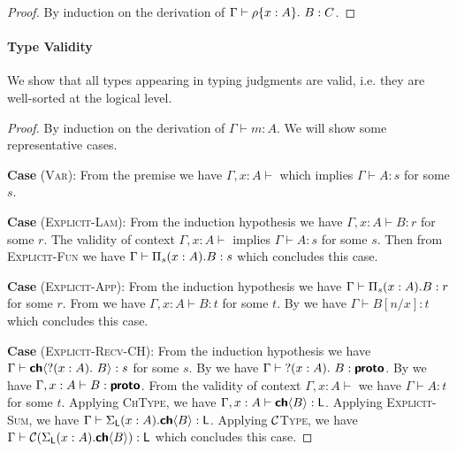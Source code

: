 \begin{proof}
  By induction on the derivation of $\Gamma \vdash {{\rho}\{{x : A}\}.\ {B}} : C$.
\end{proof}

\paragraph{\textbf{Type Validity}}
We show that all types appearing in typing judgments are valid, i.e. they are well-sorted
at the logical level.

\begin{proof}
  By induction on the derivation of $\Gamma \vdash m : A$. We will show some representative cases.

\textbf{Case} (\textsc{Var}): 
  From the premise we have $\Gamma, x : A \vdash$ which implies $\Gamma \vdash A : s$ for some $s$.

\textbf{Case} (\textsc{Explicit-Lam}):
  From the induction hypothesis we have $\Gamma, x : A \vdash B : r$ for some $r$.
  The validity of context $\Gamma, x : A \vdash$ implies $\Gamma \vdash A : s$ for some $s$.
  Then from \textsc{Explicit-Fun} we have $\Gamma \vdash \Pi_{s}({x : A}).{B} : s$ which concludes this case.

\textbf{Case} (\textsc{Explicit-App}):
  From the induction hypothesis we have $\Gamma \vdash \Pi_{s}({x : A}).{B} : r$ for some $r$.
  From  we have $\Gamma, x : A \vdash B : t$ for some $t$.
  By  we have $\Gamma \vdash B[n/x] : t$ which concludes this case.

\textbf{Case} (\textsc{Explicit-Recv-CH}):
  From the induction hypothesis we have $\Gamma \vdash {\textbf{\textsf{ch}}\langle{{{?}({x : A}).\ {B}}}\rangle} : s$ for some $s$.
  By  we have $\Gamma \vdash {{?}({x : A}).\ {B}} : \textbf{\textsf{proto}}$.
  By  we have $\Gamma, x : A \vdash B : \textbf{\textsf{proto}}$.
  From the validity of context $\Gamma, x : A \vdash$ we have $\Gamma \vdash A : t$ for some $t$.
  Applying \textsc{ChType}, we have $\Gamma, x : A \vdash {\textbf{\textsf{ch}}\langle{B}\rangle} : \textsf{L}$.
  Applying \textsc{Explicit-Sum}, we have $\Gamma \vdash \Sigma_{\textsf{L}}({x : A}).{{\textbf{\textsf{ch}}\langle{B}\rangle}} : \textsf{L}$.
  Applying \textsc{$\mathcal{C}$Type}, we have $\Gamma \vdash \mathcal{C}({\Sigma_{\textsf{L}}({x : A}).{{\textbf{\textsf{ch}}\langle{B}\rangle}}}) : \textsf{L}$ which concludes this case.
\end{proof}